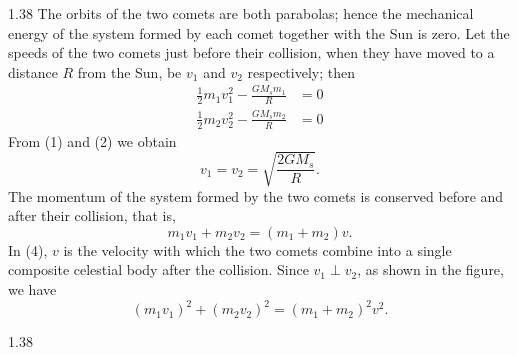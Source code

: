 \begin{solution}{1.38}
The orbits of the two comets are both parabolas; hence the mechanical energy of the system formed by each comet together with the Sun is zero. Let the speeds of the two comets just before their collision, when they have moved to a distance $R$ from the Sun, be $v_1$ and $v_2$ respectively; then
\begin{align}
\frac{1}{2}m_1v_1^2-\frac{GM_sm_1}{R} &= 0 \tag{1}\\
\frac{1}{2}m_2v_2^2-\frac{GM_sm_2}{R} &= 0 \tag{2}
\end{align}
From (1) and (2) we obtain
\begin{equation}
v_1=v_2=\sqrt{\frac{2GM_s}{R}}. \tag{3}
\end{equation}
The momentum of the system formed by the two comets is conserved before and after their collision, that is,
\begin{equation}
m_1v_1+m_2v_2=(m_1+m_2)v. \tag{4}
\end{equation}
In (4), $v$ is the velocity with which the two comets combine into a single composite celestial body after the collision. Since $v_1\perp v_2$, as shown in the figure, we have
\[
(m_1v_1)^2+(m_2v_2)^2=(m_1+m_2)^2v^2.
\]

\begin{figbox}{1.38}
\end{figbox}


\end{solution}

